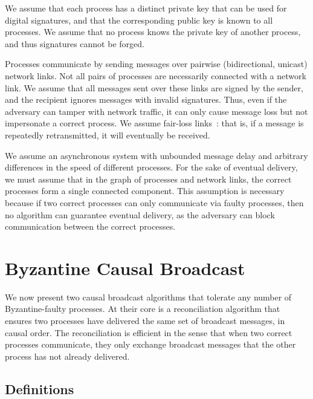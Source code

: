 \documentclass[a4paper,anonymous,USenglish]{lipics-v2019}
\begin{document}
We assume that each process has a distinct private key that can be used for digital signatures, and that the corresponding public key is known to all processes.
We assume that no process knows the private key of another process, and thus signatures cannot be forged.

Processes communicate by sending messages over pairwise (bidirectional, unicast) network links.
Not all pairs of processes are necessarily connected with a network link.
We assume that all messages sent over these links are signed by the sender, and the recipient ignores messages with invalid signatures.
Thus, even if the adversary can tamper with network traffic, it can only cause message loss but not impersonate a correct process.
We assume fair-loss links~\cite{Cachin:2011wt}: that is, if a message is repeatedly retransmitted, it will eventually be received.

We assume an asynchronous system with unbounded message delay and arbitrary differences in the speed of different processes.
For the sake of eventual delivery, we must assume that in the graph of processes and network links, the correct processes form a single connected component.
This assumption is necessary because if two correct processes can only communicate via faulty processes, then no algorithm can guarantee eventual delivery, as the adversary can block communication between the correct processes.




\section{Byzantine Causal Broadcast}\label{sec:algorithm}

We now present two causal broadcast algorithms that tolerate any number of Byzantine-faulty processes.
At their core is a reconciliation algorithm that ensures two processes have delivered the same set of broadcast messages, in causal order.
The reconciliation is efficient in the sense that when two correct processes communicate, they only exchange broadcast messages that the other process has not already delivered.

\subsection{Definitions}
\end{document}
